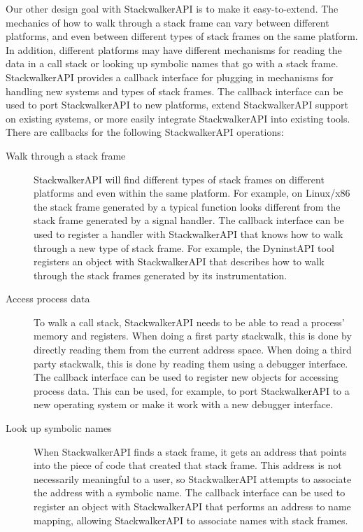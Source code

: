 Our other design goal with StackwalkerAPI is to make it easy-to-extend. The
mechanics of how to walk through a stack frame can vary between different
platforms, and even between different types of stack frames on the same
platform. In addition, different platforms may have different mechanisms for
reading the data in a call stack or looking up symbolic names that go with a
stack frame. StackwalkerAPI provides a callback interface for plugging in
mechanisms for handling new systems and types of stack frames. The callback
interface can be used to port StackwalkerAPI to new platforms, extend
StackwalkerAPI support on existing systems, or more easily integrate
StackwalkerAPI into existing tools. There are callbacks for the following
StackwalkerAPI operations:

\begin{description}
    \item[Walk through a stack frame] StackwalkerAPI will find different types
        of stack frames on different platforms and even within the same
        platform. For example, on Linux/x86 the stack frame generated by a
        typical function looks different from the stack frame generated by a
        signal handler. The callback interface can be used to register a handler
        with StackwalkerAPI that knows how to walk through a new type of stack
        frame. For example, the DyninstAPI tool registers an object with
        StackwalkerAPI that describes how to walk through the stack frames
        generated by its instrumentation.
    
    \item[Access process data] To walk a call stack, StackwalkerAPI needs to be
        able to read a process' memory and registers. When doing a first party
        stackwalk, this is done by directly reading them from the current
        address space. When doing a third party stackwalk, this is done by
        reading them using a debugger interface. The callback interface can be
        used to register new objects for accessing process data. This can be
        used, for example, to port StackwalkerAPI to a new operating system or
        make it work with a new debugger interface.
    
    \item[Look up symbolic names] When StackwalkerAPI finds a stack frame, it
        gets an address that points into the piece of code that created that
        stack frame. This address is not necessarily meaningful to a user, so
        StackwalkerAPI attempts to associate the address with a symbolic name.
        The callback interface can be used to register an object with
        StackwalkerAPI that performs an address to name mapping, allowing
        StackwalkerAPI to associate names with stack frames.  
\end{description}
